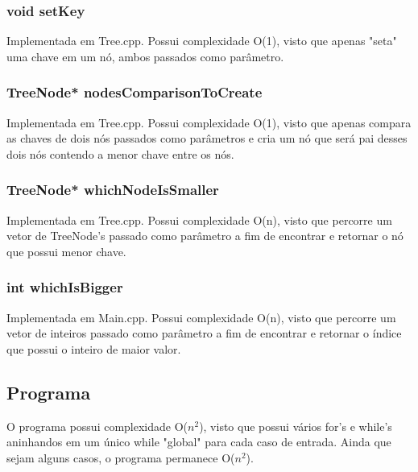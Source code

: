 \documentclass[a4paper,12pt]{article}
\begin{document}
        \subsubsection{void setKey}
            Implementada em Tree.cpp. Possui complexidade O(1), visto que apenas "seta" uma chave em um nó, ambos passados como parâmetro.
            
        \subsubsection{TreeNode* nodesComparisonToCreate}
            Implementada em Tree.cpp. Possui complexidade O(1), visto que apenas compara as chaves de dois nós passados como parâmetros e cria um nó que será pai desses dois nós contendo a menor chave entre os nós.
            
        \subsubsection{TreeNode* whichNodeIsSmaller}
            Implementada em Tree.cpp. Possui complexidade O(n), visto que percorre um vetor de TreeNode's passado como parâmetro a fim de encontrar e retornar o nó que possui menor chave.
            
        \subsubsection{int whichIsBigger}
            Implementada em Main.cpp. Possui complexidade O(n), visto que percorre um vetor de inteiros passado como parâmetro a fim de encontrar e retornar o índice que possui o inteiro de maior valor. 
    
    \subsection{Programa}
        O programa possui complexidade O($n^2$), visto que possui vários for's e while's aninhandos em um único while "global" para cada caso de entrada. Ainda que sejam alguns casos, o programa permanece O($n^2$). 
\end{document}
